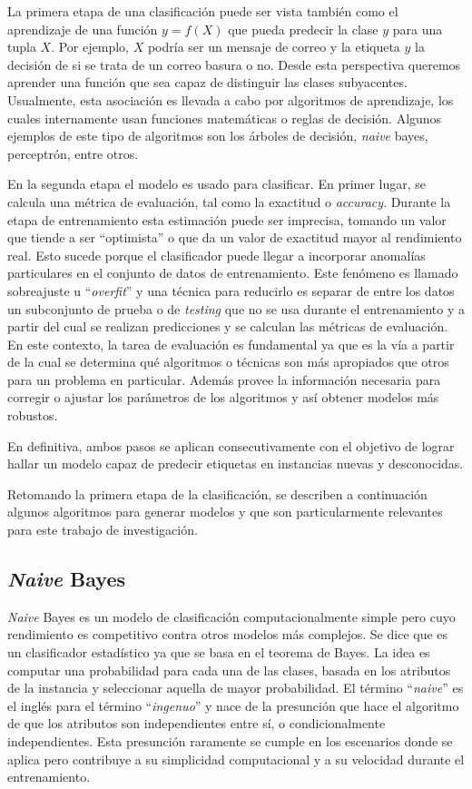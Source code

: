 La primera etapa de una clasificación puede ser vista también como el
aprendizaje de una función $y=f(X)$ que pueda predecir la clase $y$ para una
tupla $X$. Por ejemplo, $X$ podría ser un mensaje de correo y la etiqueta $y$ la
decisión de si se trata de un correo basura o no. Desde esta perspectiva
queremos aprender una función que sea capaz de distinguir las clases
subyacentes.  Usualmente, esta asociación es llevada a cabo por algoritmos de
aprendizaje, los cuales internamente usan funciones matemáticas o reglas de
decisión. Algunos ejemplos de este tipo de algoritmos son los árboles de
decisión, \textit{naive} bayes, perceptrón, entre otros.

En la segunda etapa el modelo es usado para clasificar. En primer lugar, se
calcula una métrica de evaluación, tal como la exactitud o \textit{accuracy}.
Durante la etapa de entrenamiento esta estimación puede ser imprecisa, tomando
un valor que tiende a ser “optimista” o que da un valor de exactitud mayor al
rendimiento real. Esto sucede porque el clasificador puede llegar a incorporar
anomalías particulares en el conjunto de datos de entrenamiento. Este fenómeno
es llamado sobreajuste u “\textit{overfit}” y una técnica para reducirlo es
separar de entre los datos un subconjunto de prueba o de \textit{testing} que no
se usa durante el entrenamiento y a partir del cual se realizan predicciones y
se calculan las métricas de evaluación. En este contexto, la tarea de evaluación
es fundamental ya que es la vía a partir de la cual se determina qué algoritmos
o técnicas son más apropiados que otros para un problema en particular. Además
provee la información necesaria para corregir o ajustar los parámetros de los
algoritmos y así obtener modelos más robustos.

En definitiva, ambos pasos se aplican consecutivamente con el objetivo de lograr
hallar un modelo capaz de predecir etiquetas en instancias nuevas y
desconocidas.

Retomando la primera etapa de la clasificación, se describen a continuación
algunos algoritmos para generar modelos y que son particularmente relevantes
para este trabajo de investigación.

\subsection{\textit{Naive} Bayes}

\textit{Naive} Bayes es un modelo de clasificación computacionalmente simple
pero cuyo rendimiento es competitivo contra otros modelos más complejos. Se dice
que es un clasificador estadístico ya que se basa en el teorema de Bayes. La
idea es computar una probabilidad para cada una de las clases, basada en los
atributos de la instancia y seleccionar aquella de mayor probabilidad. El
término “\textit{naive}” es el inglés para el término “\textit{ingenuo}” y nace
de la presunción que hace el algoritmo de que los atributos son independientes
entre sí, o condicionalmente independientes. Esta presunción raramente se cumple
en los escenarios donde se aplica pero contribuye a su simplicidad computacional
y a su velocidad durante el entrenamiento.

